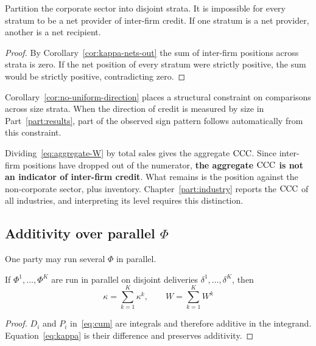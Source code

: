 \begin{corollary}
\label{cor:no-uniform-direction}
Partition the corporate sector into disjoint strata. It is impossible for every stratum to
be a net provider of inter-firm credit. If one stratum is a net provider, another is a net
recipient.
\end{corollary}

\begin{proof}
By Corollary~\ref{cor:kappa-nets-out} the sum of inter-firm positions across strata is zero.
If the net position of every stratum were strictly positive, the sum would be strictly
positive, contradicting zero.
\end{proof}

Corollary~\ref{cor:no-uniform-direction} places a structural constraint on comparisons
across size strata. When the direction of credit is measured by size in
Part~\ref{part:results}, part of the observed sign pattern follows automatically from this
constraint.

\begin{remark}
Dividing~\eqref{eq:aggregate-W} by total sales gives the aggregate $\mathrm{CCC}$. Since inter-firm
positions have dropped out of the numerator, \textbf{the aggregate $\mathrm{CCC}$ is not an
indicator of inter-firm credit}. What remains is the position against the non-corporate
sector, plus inventory. Chapter~\ref{part:industry} reports the $\mathrm{CCC}$ of all industries,
and interpreting its level requires this distinction.
\end{remark}

\subsection{Additivity over parallel $\Phi$}
\label{sec:kappa-additive}

One party may run several $\Phi$ in parallel.

\begin{proposition}
\label{prop:kappa-additive}
If $\Phi^1,\dots,\Phi^K$ are run in parallel on disjoint deliveries
$\delta^1,\dots,\delta^K$, then
\begin{equation}
\kappa = \sum_{k=1}^{K}\kappa^{k},
\qquad
W = \sum_{k=1}^{K} W^{k}
\label{eq:kappa-additive}
\end{equation}
\end{proposition}

\begin{proof}
$D_i$ and $P_i$ in~\eqref{eq:cum} are integrals and therefore additive in the integrand.
Equation~\eqref{eq:kappa} is their difference and preserves additivity.
\end{proof}

